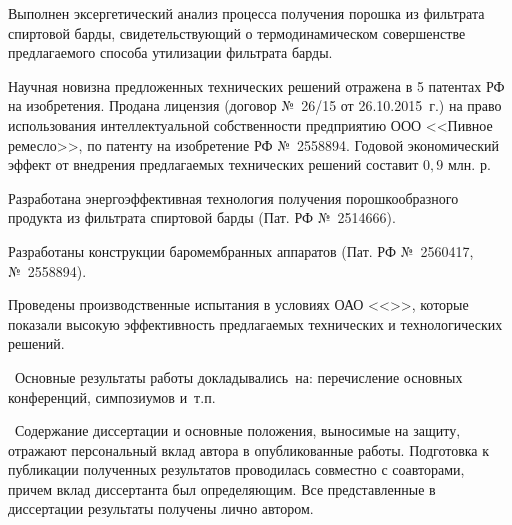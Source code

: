 Выполнен эксергетический анализ процесса  получения порошка из фильтрата спиртовой барды, свидетельствующий о термодинамическом совершенстве предлагаемого
способа утилизации фильтрата барды.

Научная новизна предложенных технических решений отражена в 5 патентах РФ на изобретения.
Продана лицензия (договор №~26/15 от 26.10.2015~г.) на право использования интеллектуальной собственности предприятию ООО <<Пивное ремесло>>, по патенту на изобретение РФ №~2558894.
Годовой экономический эффект от внедрения предлагаемых технических решений составит \(0,9\) млн. р.


Разработана энергоэффективная технология получения порошкообразного продукта из фильтрата спиртовой барды (Пат. РФ №~2514666).

Разработаны конструкции баромембранных аппаратов (Пат. РФ №~2560417, №~2558894).

Проведены производственные испытания в условиях ОАО <<>>, которые показали высокую эффективность предлагаемых технических и технологических решений.

\probation\
Основные результаты работы докладывались~на:
перечисление основных конференций, симпозиумов и~т.\:п.

\contribution\ Содержание диссертации и основные положения, выносимые на защиту, отражают персональный вклад автора в опубликованные работы.
Подготовка к публикации полученных результатов проводилась совместно с соавторами, причем вклад диссертанта был определяющим. Все представленные в диссертации результаты получены лично автором.



